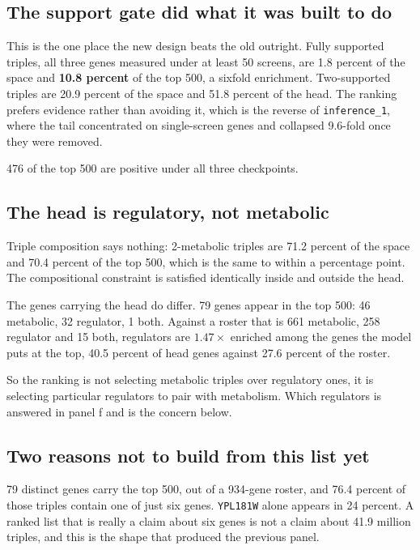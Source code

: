 \subsection{The support gate did what it was built to do}

This is the one place the new design beats the old outright. Fully supported
triples, all three genes measured under at least 50 screens, are 1.8 percent of
the space and \textbf{10.8 percent} of the top 500, a sixfold enrichment.
Two-supported triples are 20.9 percent of the space and 51.8 percent of the head.
The ranking prefers evidence rather than avoiding it, which is the reverse of
\texttt{inference\_1}, where the tail concentrated on single-screen genes and
collapsed 9.6-fold once they were removed.

476 of the top 500 are positive under all three checkpoints.

\subsection{The head is regulatory, not metabolic}

Triple composition says nothing: 2-metabolic triples are 71.2 percent of the
space and 70.4 percent of the top 500, which is the same to within a percentage
point. The compositional constraint is satisfied identically inside and outside
the head.

The genes carrying the head do differ. 79 genes appear in the top 500: 46
metabolic, 32 regulator, 1 both. Against a roster that is 661 metabolic, 258
regulator and 15 both, regulators are $1.47\times$ enriched among the genes the
model puts at the top, 40.5 percent of head genes against 27.6 percent of the
roster.

So the ranking is not selecting metabolic triples over regulatory ones, it is
selecting particular regulators to pair with metabolism. Which regulators is
answered in panel f and is the concern below.

\subsection{Two reasons not to build from this list yet}

 79 distinct genes carry the top 500, out of a
934-gene roster, and 76.4 percent of those triples contain one of just six genes.
\texttt{YPL181W} alone appears in 24 percent. A ranked list that is really a claim
about six genes is not a claim about 41.9 million triples, and this is the shape
that produced the previous panel.

